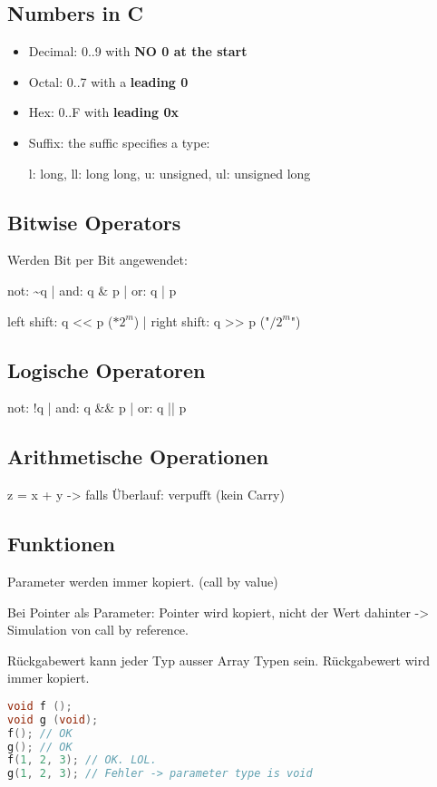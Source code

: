 \begin{multicols*}{4}
\subsection{Numbers in C}
\begin{itemize}
    \item Decimal: 0..9 with \textbf{NO 0 at the start}
    \item Octal: 0..7 with a \textbf{leading 0}
    \item Hex: 0..F with \textbf{leading 0x}
    \item Suffix: the suffic specifies a type:

    l: long, ll: long long, u: unsigned, ul: unsigned long
\end{itemize}

\subsection{Bitwise Operators}
Werden Bit per Bit angewendet:

not: \~{}q | and: q \& p | or: q | p

left shift: q << p (\(* 2^m\)) | right shift: q >> p ("\(/ 2^m\)")
\subsection{Logische Operatoren}
not: !q | and: q \&\& p | or: q || p

\subsection{Arithmetische Operationen}
z = x + y -> falls Überlauf: verpufft (kein Carry)

\subsection{Funktionen}
Parameter werden immer kopiert. (call by value)\vspace{2pt}

Bei Pointer als Parameter: Pointer wird kopiert, nicht der Wert dahinter -> Simulation von call by reference.\vspace{2pt}

Rückgabewert kann jeder Typ ausser Array Typen sein. Rückgabewert wird immer kopiert.

\begin{lstlisting}[language=c]
void f ();
void g (void);
f(); // OK
g(); // OK
f(1, 2, 3); // OK. LOL.
g(1, 2, 3); // Fehler -> parameter type is void
\end{lstlisting}


\end{multicols*}
